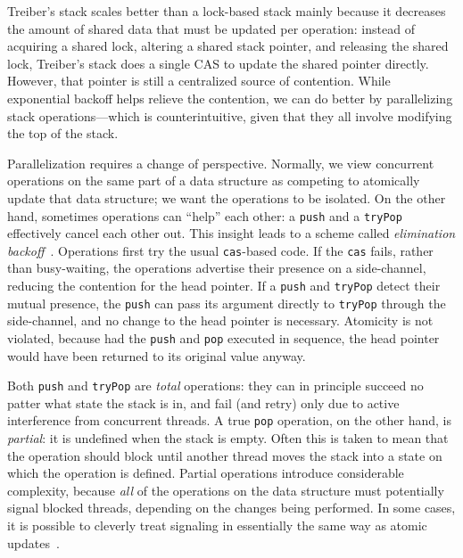 \documentclass[preprint,nocopyrightspace]{sigplanconf}
\begin{document}


Treiber's stack scales better than a lock-based stack mainly because it
decreases the amount of shared data that must be updated per operation: instead
of acquiring a shared lock, altering a shared stack pointer, and releasing the
shared lock, Treiber's stack does a single CAS to update the shared pointer
directly.  However, that pointer is still a centralized source of contention.
While exponential backoff helps relieve the contention, we can do better by
parallelizing stack operations---which is counterintuitive, given that they all
involve modifying the top of the stack.

Parallelization requires a change of perspective.  Normally, we view concurrent
operations on the same part of a data structure as competing to atomically
update that data structure; we want the operations to be isolated.  On the other
hand, sometimes operations can ``help'' each other: a \lstinline{push} and a
\lstinline{tryPop} effectively cancel each other out.  This insight leads to a
scheme called \emph{elimination backoff}~\cite{Shavit1997a,Hendler2004}.
Operations first try the usual \lstinline{cas}-based code.  If the
\lstinline{cas} fails, rather than busy-waiting, the operations advertise their
presence on a side-channel, reducing the contention for the head pointer.  If a
\lstinline{push} and \lstinline{tryPop} detect their mutual presence, the
\lstinline{push} can pass its argument directly to \lstinline{tryPop} through
the side-channel, and no change to the head pointer is necessary.  Atomicity is
not violated, because had the \lstinline{push} and \lstinline{pop} executed in
sequence, the head pointer would have been returned to its original value
anyway.

Both \lstinline{push} and \lstinline{tryPop} are \emph{total} operations: they
can in principle succeed no patter what state the stack is in, and fail (and
retry) only due to active interference from concurrent threads.  A true
\lstinline{pop} operation, on the other hand, is \emph{partial}: it is undefined
when the stack is empty.  Often this is taken to mean that the operation should
block until another thread moves the stack into a state on which the operation
is defined.  Partial operations introduce considerable complexity, because
\emph{all} of the operations on the data structure must potentially signal
blocked threads, depending on the changes being performed.  In some cases, it is
possible to cleverly treat signaling in essentially the same way as atomic
updates~\cite{Scherer2004}.
\end{document}
